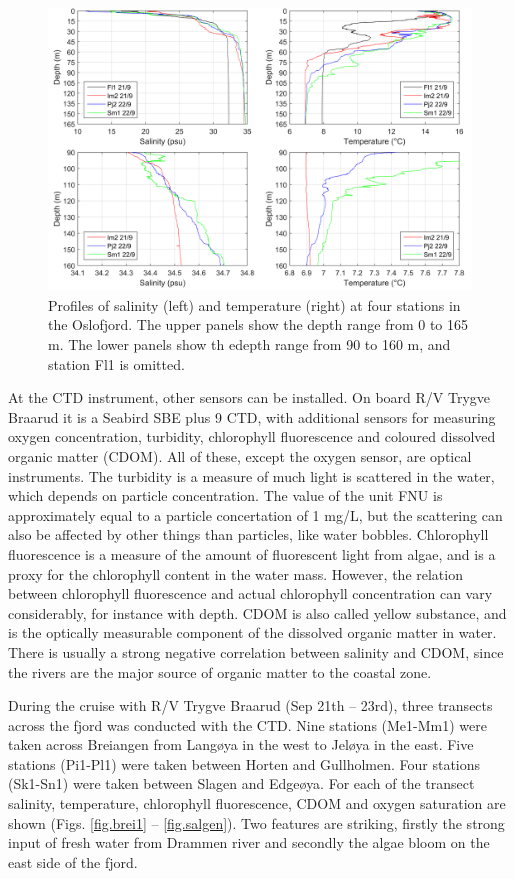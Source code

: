 \documentclass[12pt,a4paper,english]{article}
\begin{document}
\begin{figure}[ht]
\centerline{
\includegraphics*[width=\textwidth]{Figurer/Fig_profiles.png}}
\caption{\small
Profiles of salinity (left) and temperature (right) at four stations in the 
Oslofjord. The upper panels show the depth range from 0 to 165 m.
The lower panels show th edepth range from 90 to 160 m, and station Fl1 is omitted.
}
\label{fig:profiles}
\end{figure}

At the CTD instrument, other sensors can be installed. 
On board R/V Trygve Braarud it is a Seabird SBE plus 9 CTD, 
with additional sensors for measuring oxygen concentration, turbidity, 
chlorophyll fluorescence and coloured dissolved organic matter (CDOM). 
All of these, except the oxygen sensor, are optical instruments. 
The turbidity is a measure of much light is scattered in the water, 
which depends on particle concentration. The value of the unit FNU is 
approximately equal to a particle concertation of 1 mg/L, 
but the scattering can also be affected by other things than particles, 
like water bobbles. Chlorophyll fluorescence is a measure of the amount 
of fluorescent light from algae, and is a proxy for the chlorophyll content 
in the water mass. However, the relation between chlorophyll fluorescence 
and actual chlorophyll concentration can vary considerably, 
for instance with depth. 
CDOM is also called yellow substance, and is the optically measurable 
component of the dissolved organic matter in water. 
There is usually a strong negative correlation between salinity and CDOM, 
since the rivers are the major source of organic matter to the coastal zone. 

During the cruise with R/V Trygve Braarud (Sep 21th – 23rd), three transects 
across the fjord was conducted with the CTD. Nine stations (Me1-Mm1) were taken 
across Breiangen from Lang{\o}ya in the west to Jel{\o}ya in the east. 
Five stations (Pi1-Pl1) were taken between Horten and Gullholmen. 
Four stations (Sk1-Sn1) were taken between Slagen and Edge{\o}ya. 
For each of the transect salinity, temperature, chlorophyll fluorescence, 
CDOM and oxygen saturation are shown (Figs. \ref{fig.brei1} – \ref{fig.salgen}). 
Two features are striking, 
firstly the strong input of fresh water from Drammen river and secondly the algae 
bloom on the east side of the fjord.
\end{document}
